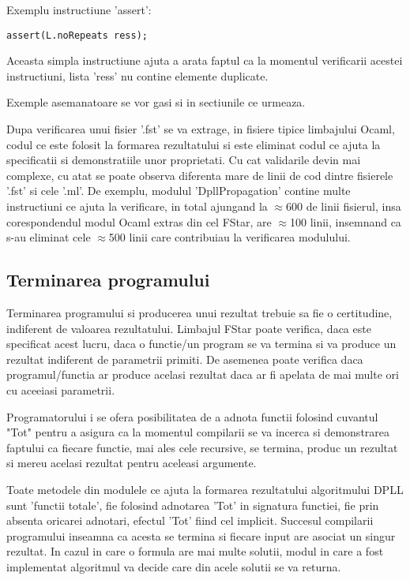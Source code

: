 Exemplu instructiune 'assert':
\begin{lstlisting}[]
assert(L.noRepeats ress);

\end{lstlisting}

Aceasta simpla instructiune ajuta a arata faptul ca la momentul verificarii acestei instructiuni, lista 'ress' nu contine elemente duplicate.

Exemple asemanatoare se vor gasi si in sectiunile ce urmeaza.

Dupa verificarea unui fisier '.fst' se va extrage, in fisiere tipice limbajului Ocaml, codul ce este folosit la formarea rezultatului si este eliminat codul ce ajuta la \newline specificatii si demonstratiile unor proprietati. Cu cat validarile devin mai complexe, cu atat se poate observa diferenta mare de linii de cod dintre fisierele '.fst' si cele '.ml'.
De exemplu, modulul 'DpllPropagation' contine multe instructiuni ce ajuta la verificare, in total ajungand la $\approx$600 de linii fisierul, insa corespondendul modul Ocaml extras din cel FStar, are $\approx$100 linii, insemnand ca s-au eliminat cele $\approx$500 linii care contribuiau la verificarea modulului.

\subsection{Terminarea programului}

Terminarea programului si producerea unui rezultat trebuie sa fie o certitudine, indiferent de valoarea rezultatului. Limbajul FStar poate verifica, daca este specificat acest lucru, daca o functie/un program se va termina si va produce un rezultat indiferent de parametrii primiti. De asemenea poate verifica daca programul/functia ar produce acelasi rezultat daca ar fi apelata de mai multe ori cu aceeiasi parametrii.

Programatorului i se ofera posibilitatea de a adnota functii folosind cuvantul "Tot" pentru a asigura ca la momentul compilarii se va incerca si demonstrarea faptului ca fiecare functie, mai ales cele recursive, se termina, produc un rezultat si mereu acelasi rezultat pentru aceleasi argumente. 

\newpage

Toate metodele din modulele ce ajuta la formarea rezultatului algoritmului DPLL sunt 'functii totale', fie folosind adnotarea 'Tot' in signatura functiei, fie prin absenta oricarei adnotari, efectul 'Tot' fiind cel implicit. Succesul compilarii programului inseamna ca acesta se termina si fiecare input are asociat un singur rezultat. In cazul in care o formula are mai multe solutii, modul in care a fost implementat algoritmul va decide care din acele solutii se va returna.


